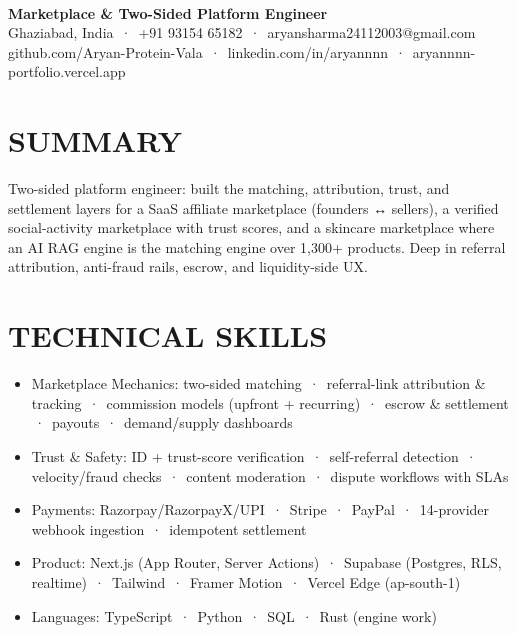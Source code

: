 \documentclass[9pt]{article}
\begin{document}
\\[3pt]
{\large\bfseries Marketplace \& Two-Sided Platform Engineer}\\[3pt]
{\small\color{greyc} Ghaziabad, India \,·\, +91 93154 65182 \,·\, aryansharma24112003@gmail.com}\vspace{-2pt}
{\small\color{greyc} github.com/Aryan-Protein-Vala \,·\, linkedin.com/in/aryannnn \,·\, aryannnn-portfolio.vercel.app}\vspace{-2pt}
\section*{SUMMARY}
Two-sided platform engineer: built the matching, attribution, trust, and settlement layers for a SaaS affiliate marketplace (founders ↔ sellers), a verified social-activity marketplace with trust scores, and a skincare marketplace where an AI RAG engine is the matching engine over 1,300+ products. Deep in referral attribution, anti-fraud rails, escrow, and liquidity-side UX.
\vspace{1pt}
\section*{TECHNICAL SKILLS}
\begin{itemize}[leftmargin=11pt,itemsep=0pt,topsep=1pt,parsep=0pt]
\item Marketplace Mechanics: two-sided matching \,·\, referral-link attribution \& tracking \,·\, commission models (upfront + recurring) \,·\, escrow \& settlement \,·\, payouts \,·\, demand/supply dashboards
\item Trust \& Safety: ID + trust-score verification \,·\, self-referral detection \,·\, velocity/fraud checks \,·\, content moderation \,·\, dispute workflows with SLAs
\item Payments: Razorpay/RazorpayX/UPI \,·\, Stripe \,·\, PayPal \,·\, 14-provider webhook ingestion \,·\, idempotent settlement
\item Product: Next.js (App Router, Server Actions) \,·\, Supabase (Postgres, RLS, realtime) \,·\, Tailwind \,·\, Framer Motion \,·\, Vercel Edge (ap-south-1)
\item Languages: TypeScript \,·\, Python \,·\, SQL \,·\, Rust (engine work)
\end{itemize}
\end{document}
